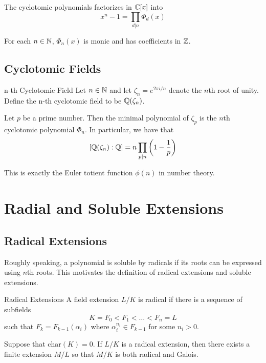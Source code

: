 \documentclass[a4paper]{article}
\begin{document}
\begin{prp}{}{} The cyclotomic polynomials factorizes in $\mathbb{C}[x]$ into $$x^n-1=\prod_{d|n}\Phi_d(x)$$
\end{prp}

\begin{prp}{}{} For each $n\in\mathbb{N}$, $\Phi_n(x)$ is monic and has coefficients in $\mathbb{Z}$. 
\end{prp}

\subsection{Cyclotomic Fields}
\begin{defn}{n-th Cyclotomic Field}{} Let $n\in\mathbb{N}$ and let $\zeta_n=e^{2\pi i/n}$ denote the $n$th root of unity. Define the n-th cyclotomic field to be $\mathbb{Q}(\zeta_n)$. 
\end{defn}

\begin{prp}{}{} Let $p$ be a prime number. Then the minimal polynomial of $\zeta_p$ is the $n$th cyclotomic polynomial $\Phi_n$. In particular, we have that $$[\mathbb{Q}(\zeta_n):\mathbb{Q}]=n\prod_{p|n}\left(1-\frac{1}{p}\right)$$
\end{prp}

This is exactly the Euler totient function $\phi(n)$ in number theory. 

\pagebreak
\section{Radial and Soluble Extensions}
\subsection{Radical Extensions}
Roughly speaking, a polynomial is soluble by radicals if its roots can be expressed using $n$th roots. This motivates the definition of radical extensions and soluble extensions. 

\begin{defn}{Radical Extensions}{} A field extension $L/K$ is radical if there is a sequence of subfields $$K=F_0<F_1<\dots<F_n=L$$ such that $F_k=F_{k-1}(\alpha_i)$ where $\alpha_i^{n_i}\in F_{k-1}$ for some $n_i>0$. 
\end{defn}

\begin{prp}{}{} Suppose that $\text{char}(K)=0$. If $L/K$ is a radical extension, then there exists a finite extension $M/L$ so that $M/K$ is both radical and Galois. 
\end{prp}
\end{document}
